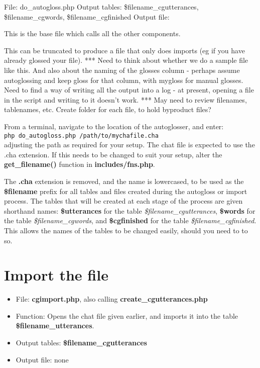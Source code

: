 \documentclass[a4paper,10pt]{article}
\begin{document}
File: do\_autogloss.php
Output tables: \$filename\_cgutterances, \$filename\_cgwords, \$filename\_cgfinished
Output file: 

This is the base file which calls all the other components.  

This can be truncated to produce a file that only does imports (eg if you have already glossed your file).  
*** Need to think about whether we do a sample file like this.  And also about the naming of the glosses column - perhaps assume autoglossing and keep gloss for that column, with mygloss for manual glosses.  Need to find a way of writing all the output into a log - at present, opening a file in the script and writing to it doesn't work.
*** May need to review filenames, tablenames, etc.  Create folder for each file, to hold byproduct files? 

From a terminal, navigate to the location of the autoglosser, and enter:\\
\texttt{php do\_autogloss.php /path/to/mychafile.cha}\\
adjusting the path as required for your setup.  The chat file is expected to use the .cha extension.  If this needs to be changed to suit your setup, alter the \textbf{get\_filename()} function in \textbf{includes/fns.php}.

The \textbf{.cha} extension is removed, and the name is lowercased, to be used as the \textbf{\$filename} prefix for all tables and files created during the autogloss or import process.  The tables that will be created at each stage of the process are given shorthand names: \textbf{\$utterances} for the table \textit{\$filename\_cgutterances}, \textbf{\$words} for the table \textit{\$filename\_cgwords}, and \textbf{\$cgfinished} for the table \textit{\$filename\_cgfinished}.  This allows the names of the tables to be changed easily, should you need to to so.


\section{Import the file}
\label{sec:import}

\begin{itemize}
\item File: \textbf{cgimport.php}, also calling \textbf{create\_cgutterances.php}
\item Function: Opens the chat file given earlier, and imports it into the table \textbf{\$filename\_utterances}.
\item Output tables: \textbf{\$filename\_cgutterances}
\item Output file: none                 
\end{itemize}
\end{document}
